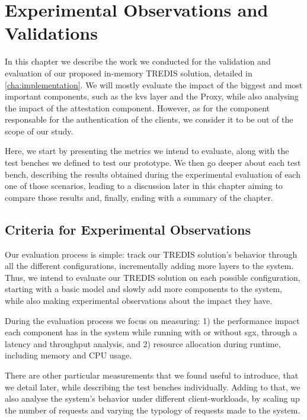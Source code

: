 \chapter{Experimental Observations and Validations}
\label{cha:experimentalEvaluation}

In this chapter we describe the work we conducted for the validation and evaluation of our proposed in-memory TREDIS solution, detailed in \ref{cha:implementation}. We will mostly evaluate the impact of the biggest and most important components, such as the \gls{kvs} layer and the Proxy, while also analysing the impact of the attestation component. However, as for the component responsable for the authentication of the clients, we consider it to be out of the scope of our study.

Here, we start by presenting the metrics we intend to evaluate, along with the test benches we defined to test our prototype.
We then go deeper about each test bench, describing the results obtained during the experimental evaluation of each one of those scenarios, leading to a discussion later in this chapter aiming to compare those results and, finally, ending with a summary of the chapter.


\section{Criteria for Experimental Observations}
\label{sec:criteriaForExperimentalObservations}

Our evaluation process is simple: track our TREDIS solution's behavior through all the different configurations, incrementally adding more layers to the system. Thus, we intend to evaluate our TREDIS solution on each possible configuration, starting with a basic model and slowly add more components to the system, while also making experimental observations about the impact they have. 

During the evaluation process we focus on measuring: 1) the performance impact each component has in the system while running with or without \gls{sgx}, through a latency and throughput analysis, and 2) resource allocation during runtime, including memory and CPU usage. 

There are other particular measurements that we found useful to introduce, that we detail later, while describing the test benches individually.
Adding to that, we also analyse the system's behavior under different client-workloads, by scaling up the number of requests and varying the typology of requests made to the system.


